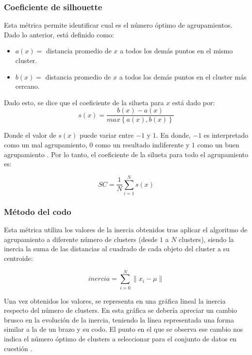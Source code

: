 \subsubsection{Coeficiente de silhouette} 
Esta métrica permite identificar cual es el número óptimo de agrupamientos. Dado lo anterior, está definido como:
\begin{itemize}[label=]
	\item $a(x)=$ distancia promedio de $x$ a todos los demás puntos en el mismo cluster.
	\item $b(x)=$ distancia promedio de $x$ a todos los demás puntos en el cluster más cercano.
\end{itemize}
Dado esto, se dice que el coeficiente de la silueta para $x$ está dado por:
\begin{equation}
	s(x) = \frac{b(x)-a(x)}{max\left\lbrace a(x), b(x) \right\rbrace }
\end{equation}

Donde el valor de $s(x)$ puede variar entre $-1$ y $1$. En donde, $-1$ es interpretado como un mal agrupamiento, $0$ como un resultado indiferente y $1$ como un buen agrupamiento \cite{Ramirez2018}. Por lo tanto, el coeficiente de la silueta para todo el agrupamiento es:

\begin{equation}
	SC = \frac{1}{N} \sum_{i = 1}^{N}s(x)
\end{equation}
\subsubsection{Método del codo}
Esta métrica utiliza los valores de la inercia obtenidos tras aplicar el algoritmo de agrupamiento a diferente número de clusters (desde $1$ a $N$ clusters), siendo la inercia la suma de las distancias al cuadrado de cada objeto del cluster a su centroide:

\begin{equation}
	inercia = \sum_{i = 0}^{N}  \parallel x_{i} - \mu  \parallel
\end{equation}

Una vez obtenidos los valores, se representa en una gráfica lineal la inercia respecto del número de clusters. En esta gráfica se debería apreciar un cambio brusco en la evolución de la inercia, teniendo la línea representada una forma similar a la de un brazo y su codo. El punto en el que se observa ese cambio nos indica el número óptimo de clusters a seleccionar para el conjunto de datos en cuestión \cite{Moya2022}. 

